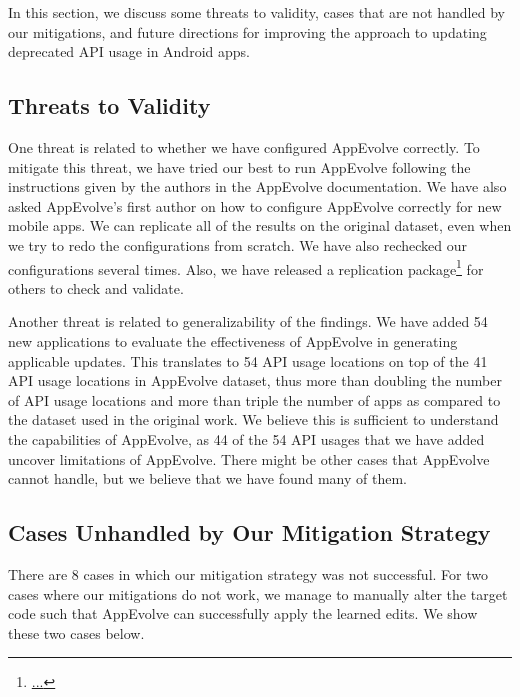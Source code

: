 In this section, we discuss some threats to validity, cases that are not
handled by our mitigations, and future directions for improving the
approach to updating deprecated API usage in Android apps.

\subsection{Threats to Validity}

One threat is related to whether we have configured AppEvolve correctly. To mitigate this threat, we have tried our best to run AppEvolve following the instructions given by the authors in the AppEvolve documentation. We have also asked AppEvolve's first author on how to configure AppEvolve correctly for new mobile apps. We can replicate all of the results on the original dataset, even when we try to redo the configurations from scratch.  We have also rechecked our configurations several times. Also, we have released a replication package\footnote{\url{...}} for others to check and validate.

Another threat is related to generalizability of the findings. We have added 54 new applications to evaluate the effectiveness of
AppEvolve in generating applicable updates. This translates to 54 API usage
locations on top of the 41 API usage locations in AppEvolve dataset, thus
more than doubling the number of API usage locations and more than triple the number of apps as compared to the dataset used in the original work. We
believe this is sufficient to understand the capabilities of AppEvolve, as
44 of the 54 API usages that we have added uncover limitations of
AppEvolve. There might be other cases that AppEvolve cannot handle, but we
believe that we have found many of them.


\subsection{Cases Unhandled by Our Mitigation Strategy}
There are 8 cases in which our mitigation strategy was not successful. For two cases where our mitigations do not work, we manage to manually alter the target code such that
AppEvolve can successfully apply the learned edits. We show these two cases below.

